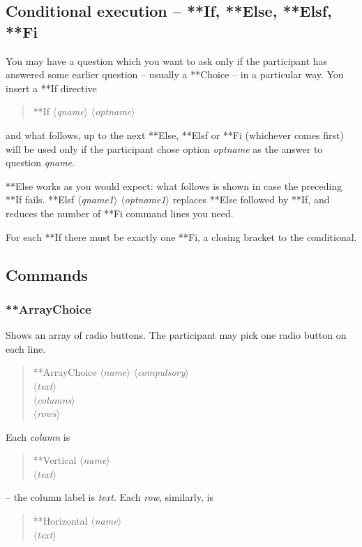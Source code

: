 \documentclass[11pt,a4paper]{article}
\newcommand{\phr}[1]{$\langle$\emph{#1}$\rangle$}
\newcommand{\seclabel}[1]{\label{sec:#1}}
\begin{document}
\subsection{Conditional execution -- **If, **Else, **Elsf, **Fi}
\seclabel{conditionalexecution}

You may have a question which you want to ask only if the participant has answered some earlier question -- usually a **Choice -- in a particular way. You insert a **If directive
\begin{quote}
**If \phr{qname} \phr{optname}
\end{quote}
and what follows, up to the next **Else, **Elsf or **Fi (whichever comes first) will be used only if the participant chose option \emph{optname} as the answer to question \emph{qname}.

**Else works as you would expect: what follows is shown in case the preceding **If fails. **Elsf \phr{qname1} \phr{optname1} replaces **Else followed by **If, and reduces the number of **Fi command lines you need.

For each **If there must be exactly one **Fi, a closing bracket to the conditional.

\subsection{Commands}
\subsubsection{**ArrayChoice}
Shows an array of radio buttons. The participant may pick one radio button on each line.
\begin{quote}
**ArrayChoice \phr{name} \phr{compulsory}\\
\phr{text} \\
\phr{columns} \\
\phr{rows}
\end{quote}
Each \emph{column} is 
\begin{quote}
**Vertical \phr{name} \\
\phr{text}
\end{quote}
-- the column label is \emph{text}. Each \emph{row}, similarly, is
\begin{quote}
**Horizontal \phr{name} \\
\phr{text}
\end{quote}
\end{document}
